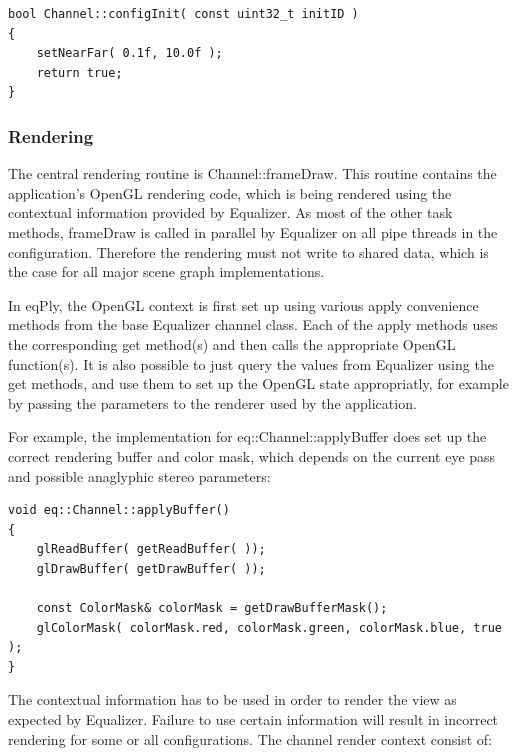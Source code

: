 \documentclass[10pt,a4]{scrartcl}
\begin{document}
{\footnotesize\begin{lstlisting}
bool Channel::configInit( const uint32_t initID )
{
    setNearFar( 0.1f, 10.0f );
    return true;
}
\end{lstlisting}}

\subsubsection{Rendering}

The central rendering routine is \textsf{Channel::frameDraw}. This
routine contains the application's OpenGL rendering code, which is being
rendered using the contextual information provided by Equalizer. As most
of the other task methods, \textsf{frameDraw} is called in parallel by
Equalizer on all pipe threads in the configuration. Therefore the
rendering must not write to shared data, which is the case for all major
scene graph implementations.

In \textsf{eqPly}, the OpenGL context is first set up using various
\textsf{apply} convenience methods from the base Equalizer channel
class. Each of the \textsf{apply} methods uses the corresponding
\textsf{get} method(s) and then calls the appropriate OpenGL
function(s). It is also possible to just query the values from Equalizer
using the \textsf{get} methods, and use them to set up the OpenGL state
appropriatly, for example by passing the parameters to the renderer used
by the application.

For example, the implementation for \textsf{eq::Channel::applyBuffer}
does set up the correct rendering buffer and color mask, which depends
on the current eye pass and possible anaglyphic stereo parameters:

{\footnotesize\begin{lstlisting}
void eq::Channel::applyBuffer()
{
    glReadBuffer( getReadBuffer( ));
    glDrawBuffer( getDrawBuffer( ));
    
    const ColorMask& colorMask = getDrawBufferMask();
    glColorMask( colorMask.red, colorMask.green, colorMask.blue, true );
}
\end{lstlisting}}

The contextual information has to be used in order to render the view as
expected by Equalizer. Failure to use certain information will result in
incorrect rendering for some or all configurations. The channel render
context consist of:
\end{document}
